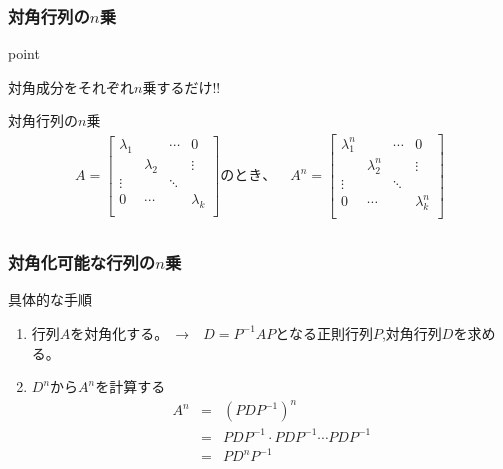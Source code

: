 \documentclass[a4paper]{jsarticle}
\begin{document}
\subsubsection{対角行列の$n$乗}
\begin{itembox}[l]{point}
    \begin{center}
        対角成分をそれぞれ$n$乗するだけ!!
    \end{center}
\end{itembox}
\begin{itembox}[l]{対角行列の$n$乗}
    \begin{eqnarray*}
        A=
        \begin{bmatrix}
            \lambda_1 &           & \cdots & 0         \\
                      & \lambda_2 &        & \vdots    \\
            \vdots    &           & \ddots &           \\
            0         & \cdots    &        & \lambda_k \\
        \end{bmatrix}
        のとき、\quad A^n=
        \begin{bmatrix}
            \lambda_1^n &             & \cdots & 0           \\
                        & \lambda_2^n &        & \vdots      \\
            \vdots      &             & \ddots &             \\
            0           & \cdots      &        & \lambda_k^n \\
        \end{bmatrix}\\
    \end{eqnarray*}
\end{itembox}
\subsubsection{対角化可能な行列の$n$乗}
\begin{itembox}[l]{具体的な手順}
    \begin{enumerate}
        \item 行列$A$を対角化する。　→　$D=P^{-1}AP$となる正則行列$P$,対角行列$D$を求める。
        \item $D^n$から$A^n$を計算する
              \begin{eqnarray*}
                  A^n
                  &=&\left(PDP^{-1}\right)^n\\
                  &=&PDP^{-1}\cdot PDP^{-1}\cdots PDP^{-1}\\
                  &=&PD^nP^{-1}\\
              \end{eqnarray*}
    \end{enumerate}
\end{itembox}
\newpage
\end{document}
